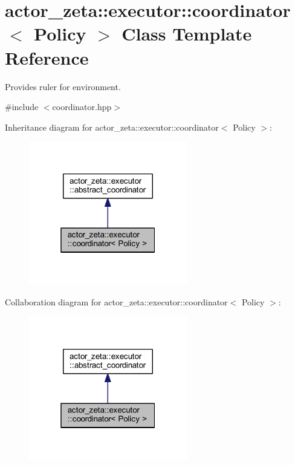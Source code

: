\hypertarget{classactor__zeta_1_1executor_1_1coordinator}{}\section{actor\+\_\+zeta\+:\+:executor\+:\+:coordinator$<$ Policy $>$ Class Template Reference}
\label{classactor__zeta_1_1executor_1_1coordinator}


Provides ruler for environment.  




{\ttfamily \#include $<$coordinator.\+hpp$>$}



Inheritance diagram for actor\+\_\+zeta\+:\+:executor\+:\+:coordinator$<$ Policy $>$\+:\nopagebreak
\begin{figure}[H]
\begin{center}
\leavevmode
\includegraphics[width=196pt]{classactor__zeta_1_1executor_1_1coordinator__inherit__graph}
\end{center}
\end{figure}


Collaboration diagram for actor\+\_\+zeta\+:\+:executor\+:\+:coordinator$<$ Policy $>$\+:\nopagebreak
\begin{figure}[H]
\begin{center}
\leavevmode
\includegraphics[width=196pt]{classactor__zeta_1_1executor_1_1coordinator__coll__graph}
\end{center}
\end{figure}
